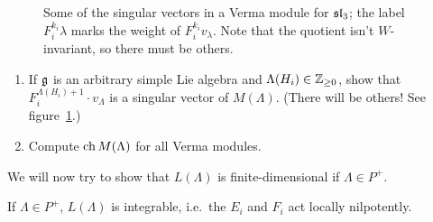 \begin{figure}[!htbp]
\centering
{}
\caption{Some of the singular vectors in a Verma module for $\sl_3$; the label
$F_i^{k_i}\lambda$ marks the weight of $F_i^{k_i}v_\lambda$. Note that the
quotient isn't $W$-invariant, so there must be others.}
\label{fig:verma-sl3}
\end{figure}

\begin{exercise}\leavevmode
\begin{enumerate}
  \item If $\g$ is an arbitrary simple Lie algebra and
    $\Lambda(H_i) \in \Z_{\geq 0}$, show that
    $F_i^{\Lambda(H_i)+1} \cdot v_\Lambda$ is a singular vector of
    $M(\Lambda)$. (There will be others! See figure~\ref{fig:verma-sl3}.)
  \item Compute $\ch M(\Lambda)$ for all Verma modules.
\end{enumerate}
\end{exercise}

 We will now try to show that $L(\Lambda)$ is finite-dimensional
if $\Lambda \in P^+$.

\begin{proposition}
If $\Lambda \in P^+$, $L(\Lambda)$ is integrable, i.e.\ the $E_i$ and $F_i$
act locally nilpotently.
\end{proposition}

